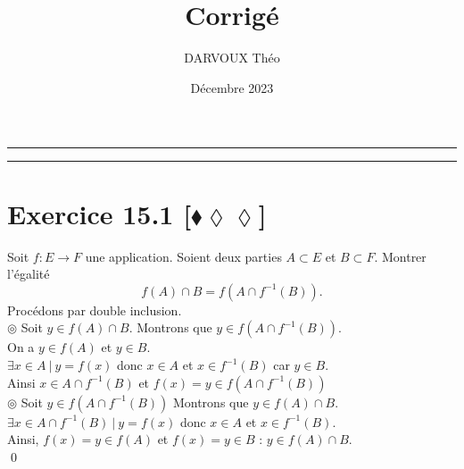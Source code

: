 \documentclass[10pt]{article}
\title{\bf{\pagetitle}\\\large{Corrigé}}
\date{Décembre 2023}
\author{DARVOUX Théo}
\def\pagetitle{Applications}
\begin{document}
\renewcommand*\contentsname{Exercices.}
\renewcommand*{\cftsecleader}{\cftdotfill{\cftdotsep}}
\maketitle

\hrule
\tableofcontents
\vspace{0.5cm}
\hrule

\thispagestyle{fancy}
\fancyhead[C]{\pagetitle}
\allowdisplaybreaks

\pagebreak


\section*{Exercice 15.1 [$\blacklozenge\lozenge\lozenge$]}
\begin{tcolorbox}[enhanced, width=7.6in, center, size=fbox, fontupper=\large, drop shadow southwest]
    Soit $f:E\to F$ une application. Soient deux parties $A \subset E$ et $B \subset F$. Montrer l'égalité
    \begin{equation*}
        f(A) \cap B = f(A \cap f^{-1}(B)).
    \end{equation*}
    Procédons par double inclusion.\\
    $\circledcirc$ Soit $y\in f(A) \cap B$. Montrons que $y\in f(A \cap f^{-1}(B))$.\\
    On a $y\in f(A)$ et $y\in B$.\\
    $\exists x\in A ~ | ~ y = f(x)$ donc $x\in A$ et $x\in f^{-1}(B)$ car $y\in B$.\\
    Ainsi $x\in A\cap f^{-1}(B)$ et $f(x) = y \in f(A \cap f^{-1}(B))$\\[0.15cm]
    $\circledcirc$ Soit $y\in f(A \cap f^{-1}(B))$ Montrons que $y\in f(A) \cap B$.\\
    $\exists x \in A \cap f^{-1}(B) ~ | ~ y = f(x)$ donc $x\in A$ et $x \in f^{-1}(B)$.\\
    Ainsi, $f(x) = y \in f(A)$ et $f(x) = y \in B$ : $y\in f(A)\cap B$.\\
    \qed
\end{tcolorbox}
\end{document}

